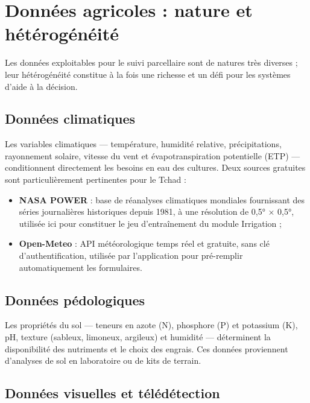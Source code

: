 \section{Données agricoles : nature et hétérogénéité}
\label{sec:donnees_agricoles}

Les données exploitables pour le suivi parcellaire sont de
natures très diverses ; leur hétérogénéité constitue à la fois
une richesse et un défi pour les systèmes d'aide à la décision.

\subsection{Données climatiques}

Les variables climatiques --- température, humidité relative,
précipitations, rayonnement solaire, vitesse du vent et
évapotranspiration potentielle (ETP) --- conditionnent
directement les besoins en eau des cultures. Deux sources
gratuites sont particulièrement pertinentes pour le Tchad :

\begin{itemize}[leftmargin=1.2cm]
	\item \textbf{NASA POWER} \cite{stackhouse2019nasa} : base de
	réanalyses climatiques mondiales fournissant des séries
	journalières historiques depuis 1981, à une résolution
	de 0,5° × 0,5°, utilisée ici pour constituer le jeu
	d'entraînement du module Irrigation ;
	\item \textbf{Open-Meteo} \cite{zippenfenig2023openmeteo} :
	API météorologique temps réel et gratuite, sans clé
	d'authentification, utilisée par l'application pour
	pré-remplir automatiquement les formulaires.
\end{itemize}

\subsection{Données pédologiques}

Les propriétés du sol --- teneurs en azote (N), phosphore (P) et
potassium (K), pH, texture (sableux, limoneux, argileux) et
humidité --- déterminent la disponibilité des nutriments et le
choix des engrais. Ces données proviennent d'analyses de sol en
laboratoire ou de kits de terrain.

\subsection{Données visuelles et télédétection}

